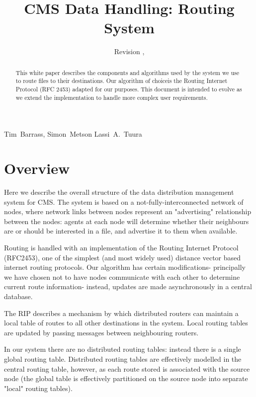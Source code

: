 \documentclass{cmspaper}
\begin{document}
\begin{titlepage}
  \whitepaper
  \date{Revision \RCSRevision, \RCSDate}
  \title{CMS Data Handling: Routing System}

  \begin{Authlist}
    Tim~Barrass, Simon~Metson
    Lassi~A.~Tuura
  \end{Authlist}

  \begin{abstract}
This white paper describes the components and algorithms used by the system we use to route files to their destinations.  Our algorithm of choiceis the Routing Internet Protocol (RFC 2453) adapted for our purposes.  This document is intended to evolve as we extend the implementation to handle more complex user requirements.
  \end{abstract} 

\end{titlepage}

\setcounter{page}{2}

\section{Overview}
Here we describe the overall structure of the data distribution management system for CMS. The system is based on a not-fully-interconnected network of nodes, where network links between nodes represent an "advertising" relationship between the nodes: agents at each node will determine whether their neighbours are or should be interested in a file, and advertise it to them when available.

Routing is handled with an implementation of the Routing Internet Protocol (RFC2453), one of the simplest (and most widely used) distance vector based internet routing protocols. Our algorithm has certain modifications- principally we have chosen not to have nodes communicate with each other to determine current route information- instead, updates are made asynchronously in a central database.

The RIP describes a mechanism by which distributed routers can maintain a local table of routes to all other destinations in the system. Local routing tables are updated by passing messages between neighbouring routers.

In our system there are no distributed routing tables: instead there is a single global routing table. Distributed routing tables are effectively modelled in the central routing table, however, as each route stored is associated with the source node (the global table is effectively partitioned on the source node into separate "local" routing tables).
\end{document}
